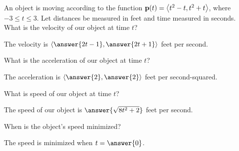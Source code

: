 \documentclass{ximera}
\begin{document}
\begin{question}
  An object is moving according to the function $\mathbf{p}(t) = \left\langle 
    t^2-t,t^2+t\right\rangle$, where $-3\leq t\leq 3$. Let distances be measured in
  feet and time measured in seconds. What is the velocity of our object at time $t$?
  \begin{prompt}
    The velocity is $\vector{\answer{2t-1},\answer{2t+1}}$ feet per
    second.
  \end{prompt}
  \begin{question}
    What is the acceleration of our object at time $t$?
    \begin{prompt}
      The acceleration is $\vector{\answer{2},\answer{2}}$ feet per second-squared.
    \end{prompt}
    \begin{question}
      What is speed of our object at time $t$?
      \begin{prompt}
        The speed of our object is $\answer{\sqrt{8t^2+2}}$ feet per second. 
      \end{prompt}
    \begin{question}
      When is the object's speed minimized?
      \begin{prompt}
        The speed is minimized when $t=\answer{0}$.
      \end{prompt}
    \end{question}
    \end{question}
  \end{question}
\end{question}
\end{document}
